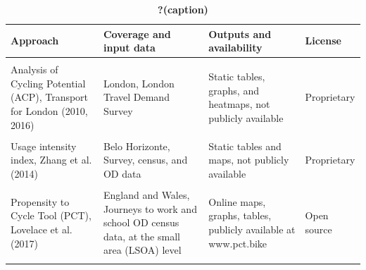 \documentclass[
  super,
  preprint,
  3p]{elsarticle}
\begin{document}
\begin{table}

\caption{\label{tbl-tools}\textbf{?(caption)}}\begin{minipage}[t]{\linewidth}

{\centering 

\centering
\begin{tabular}[t]{>{\raggedright\arraybackslash}p{13em}>{\raggedright\arraybackslash}p{15em}>{\raggedright\arraybackslash}p{12em}>{\raggedright\arraybackslash}p{5em}}
\toprule
Approach & Coverage and input data & Outputs and availability & License\\
\midrule
\cellcolor{gray!6}{Bicycle share model, Parkin et al. (2007)} & \cellcolor{gray!6}{England and Wales, Journeys to work OD census data, at the small-area (wards) level} & \cellcolor{gray!6}{Static tables in academic paper} & \cellcolor{gray!6}{Proprietary}\\
Analysis of  Cycling Potential (ACP), Transport for London (2010, 2016) & London, London Travel Demand Survey & Static tables, graphs, and heatmaps, not publicly available & Proprietary\\
\cellcolor{gray!6}{Prioritization index, Larsen et al. (2013)} & \cellcolor{gray!6}{Montreal, Survey, Road safety, and OD data} & \cellcolor{gray!6}{Map-based heatmap, not publicly available} & \cellcolor{gray!6}{Proprietary}\\
Usage intensity index, Zhang et al. (2014) & Belo Horizonte, Survey, census, and OD data & Static tables and maps, not publicly available & Proprietary\\
\cellcolor{gray!6}{The Cycling Potential Tool (CPT), Phillips and Range (2017)} & \cellcolor{gray!6}{Scotland, Environmental and socioeconomic data, at the small area (output areas) level} & \cellcolor{gray!6}{Maps showing cycling potential in each area} & \cellcolor{gray!6}{Proprietary}\\
\addlinespace
Propensity to Cycle Tool (PCT), Lovelace et al. (2017) & England and Wales, Journeys to work and school OD census data, at the small area (LSOA) level & Online maps, graphs, tables, publicly available at www.pct.bike & Open source\\
\cellcolor{gray!6}{The    Gross Potential for Cycling tool (CPC), Silva et al. (2021 and 2022)} & \cellcolor{gray!6}{21 Portuguese cities, Land use and socio-demographic data, at the small area (census tract) level} & \cellcolor{gray!6}{Static maps showing cycling potential in different areas} & \cellcolor{gray!6}{NA}\\
\bottomrule
\end{tabular}

}

\end{minipage}%

\end{table}
\end{document}
